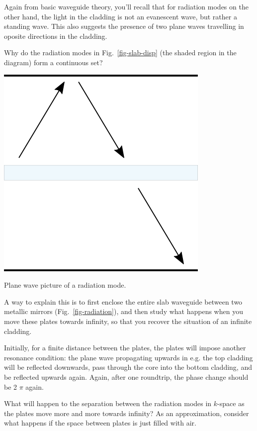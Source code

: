 Again from basic waveguide theory, you'll recall that for radiation modes on the other hand, the light in the cladding is not an evanescent wave, but rather a standing wave. This also suggests the presence of two plane waves travelling in oposite directions in the cladding.

\begin{cue}
Why do the radiation modes in Fig.~\ref{fig-slab-disp} (the shaded region in the diagram) form a continuous set?
\end{cue}

\begin{marginfigure}
\centering
\includegraphics{symmetry/figures/radiation}
\caption{Plane wave picture of a radiation mode.}
\label{fig-radiation}
\end{marginfigure}

A way to explain this is to first enclose the entire slab waveguide between two metallic mirrors (Fig.~\ref{fig-radiation}), and then study what happens when you move these plates towards infinity, so that you recover the situation of an infinite cladding.

Initially, for a finite distance between the plates, the plates will impose another resonance condition: the plane wave propagating upwards in e.g. the top cladding will be reflected downwards, pass through the core into the bottom cladding, and be reflected upwards again. Again, after one roundtrip, the phase change should be 2 $\pi$ again.

\begin{cue}
What will happen to the separation between the radiation modes in $k$-space as the plates move more and more towards infinity? As an approximation, consider what happens if the space between plates is just filled with air.
\end{cue}


